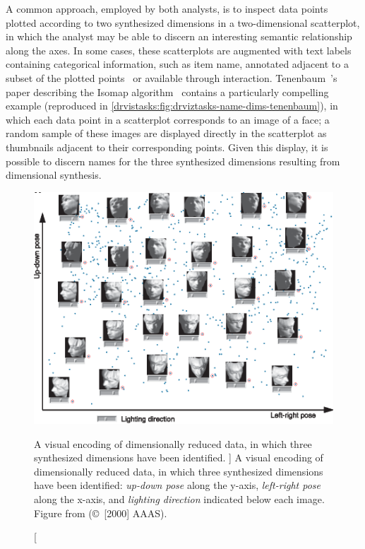 A common approach, employed by both analysts, is to inspect data points plotted according to two synthesized dimensions in a two-dimensional scatterplot, in which the analyst may be able to discern an interesting semantic relationship along the axes. 
In some cases, these scatterplots are augmented with text labels containing categorical information, such as item name, annotated adjacent to a subset of the plotted points~\cite{Buja2002,Matusik2003,Tenenbaum2000} or available through interaction. 
Tenenbaum~\etal's paper describing the Isomap algorithm~\cite{Tenenbaum2000} contains a particularly compelling example (reproduced in \autoref{drvistasks:fig:drviztasks-name-dims-tenenbaum}), in which each data point in a scatterplot corresponds to an image of a face; a random sample of these images are displayed directly in the scatterplot as thumbnails adjacent to their corresponding points.
Given this display, it is possible to discern names for the three synthesized dimensions resulting from dimensional synthesis. 

\begin{figure}
	\centering
	\includegraphics[width=\textwidth]{figures/drviztasks-name-dims-tenenbaum.eps}
	\caption
	[
	    A visual encoding of dimensionally reduced data, in which three synthesized dimensions have been identified.
	]
	{
    	 A visual encoding of dimensionally reduced data, in which three synthesized dimensions have been identified: \textsl{up-down pose} along the y-axis, \textsl{left-right pose} along the x-axis, and \textsl{lighting direction} indicated below each image.
    	 Figure from \citet{Tenenbaum2000} (\copyright~[2000] AAAS).
	}
	\centering
	\label{drvistasks:fig:drviztasks-name-dims-tenenbaum}
\end{figure} 

